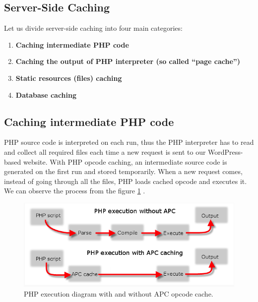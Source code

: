 \subsection{Server-Side Caching}

Let us divide server-side \gls{caching} into four main categories:

\begin{enumerate}
    \item\textbf{Caching intermediate PHP code}
    \item\textbf{Caching the output of PHP interpreter (so called “page cache”)}
    \item\textbf{Static resources (files) caching}
    \item\textbf{Database caching}
  \end{enumerate}

\subsection*{Caching intermediate PHP code}

PHP source code is interpreted on each run, thus the PHP interpreter has to read and collect all required files each time a new request is sent to our WordPress-based website. With PHP opcode caching, an intermediate source code is generated on the first run and stored temporarily. When a new request comes, instead of going through all the files, PHP loads cached opcode and executes it. We can observe the process from the figure \ref{fig:php-opcode-caching} \cite{Fig:PHP-opcode-caching}.

\begin{figure}[H]
\begin{center}
\includegraphics[scale=0.5]{figures/php-opcode-caching.png}
\caption{PHP execution diagram with and without APC opcode cache.}
\label{fig:php-opcode-caching}
\end{center}
\end{figure}

